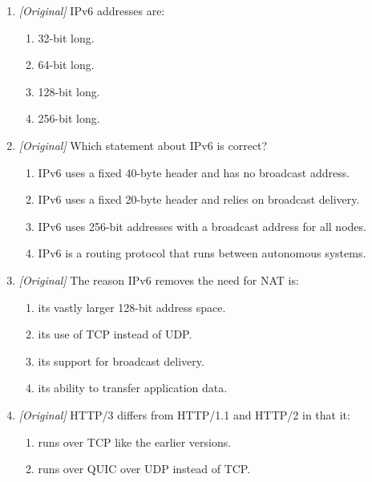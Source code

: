 \documentclass[11pt]{article}
\begin{document}
\begin{enumerate}[label=\textbf{Q\arabic*.}, leftmargin=*]
\begin{enumerate}[label=\Alph*.]
    \item BGP routes between autonomous systems; OSPF and RIP route inside a
      single domain.
    \item OSPF routes between autonomous systems; BGP routes inside one LAN.
    \item RIP is inter-domain; BGP and OSPF are mail protocols.
    \item All three transfer application data over ports.
  \end{enumerate}
\item \textit{[Original]} IPv6 addresses are:
  \begin{enumerate}[label=\Alph*.]
    \item 32-bit long.
    \item 64-bit long.
    \item 128-bit long.
    \item 256-bit long.
  \end{enumerate}
\item \textit{[Original]} Which statement about IPv6 is correct?
  \begin{enumerate}[label=\Alph*.]
    \item IPv6 uses a fixed 40-byte header and has no broadcast address.
    \item IPv6 uses a fixed 20-byte header and relies on broadcast delivery.
    \item IPv6 uses 256-bit addresses with a broadcast address for all nodes.
    \item IPv6 is a routing protocol that runs between autonomous systems.
  \end{enumerate}
\item \textit{[Original]} The reason IPv6 removes the need for NAT is:
  \begin{enumerate}[label=\Alph*.]
    \item its vastly larger 128-bit address space.
    \item its use of TCP instead of UDP.
    \item its support for broadcast delivery.
    \item its ability to transfer application data.
  \end{enumerate}
\item \textit{[Original]} HTTP/3 differs from HTTP/1.1 and HTTP/2 in that it:
  \begin{enumerate}[label=\Alph*.]
    \item runs over TCP like the earlier versions.
    \item runs over QUIC over UDP instead of TCP.

\end{enumerate}
\end{enumerate}
\end{document}
